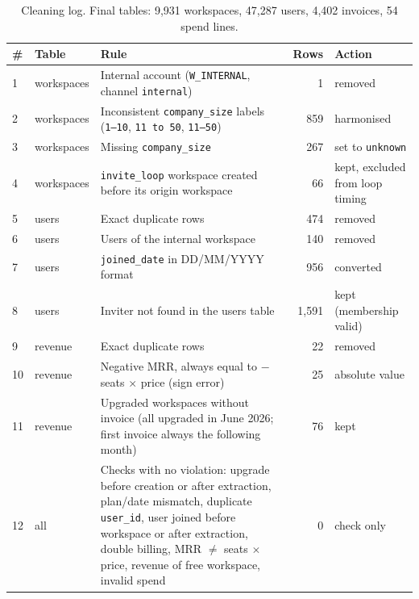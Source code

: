 \documentclass[10pt,a4paper]{article}
\begin{document}
\begin{table}[h]
\centering\footnotesize
\begin{tabularx}{\textwidth}{llXrl}
\toprule
\# & Table & Rule & Rows & Action \\
\midrule
1  & workspaces & Internal account (\texttt{W\_INTERNAL}, channel \texttt{internal}) & 1 & removed \\
2  & workspaces & Inconsistent \texttt{company\_size} labels (\texttt{1–10}, \texttt{11 to 50}, \texttt{11–50}) & 859 & harmonised \\
3  & workspaces & Missing \texttt{company\_size} & 267 & set to \texttt{unknown} \\
4  & workspaces & \texttt{invite\_loop} workspace created before its origin workspace & 66 & kept, excluded from loop timing \\
5  & users & Exact duplicate rows & 474 & removed \\
6  & users & Users of the internal workspace & 140 & removed \\
7  & users & \texttt{joined\_date} in DD/MM/YYYY format & 956 & converted \\
8  & users & Inviter not found in the users table & 1,591 & kept (membership valid) \\
9  & revenue & Exact duplicate rows & 22 & removed \\
10 & revenue & Negative MRR, always equal to $-$seats $\times$ price (sign error) & 25 & absolute value \\
11 & revenue & Upgraded workspaces without invoice (all upgraded in June 2026; first invoice always the following month) & 76 & kept \\
12 & all & Checks with no violation: upgrade before creation or after extraction, plan/date mismatch, duplicate \texttt{user\_id}, user joined before workspace or after extraction, double billing, MRR $\neq$ seats $\times$ price, revenue of free workspace, invalid spend & 0 & check only \\
\bottomrule
\end{tabularx}
\caption{Cleaning log. Final tables: 9,931 workspaces, 47,287 users, 4,402 invoices, 54 spend lines.}
\label{tab:log}
\end{table}
\end{document}
